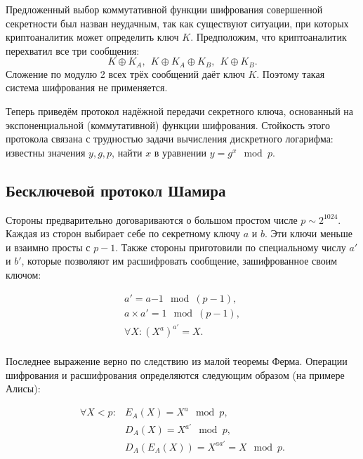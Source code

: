 Предложенный выбор коммутативной функции шифрования совершенной секретности был назван неудачным, так как существуют ситуации, при которых криптоаналитик может определить ключ $K$. Предположим, что криптоаналитик перехватил все три сообщения:
    \[ K \oplus K_A, ~~ K \oplus K_A \oplus K_B, ~~ K \oplus K_B. \]
Сложение по модулю 2 всех трёх сообщений даёт ключ $K$. Поэтому такая система шифрования не применяется.

Теперь приведём протокол надёжной передачи секретного ключа, основанный на экспоненциальной (коммутативной) функции шифрования. Стойкость этого протокола связана с трудностью задачи вычисления дискретного логарифма: известны значения $y, g, p$, найти $x$ в уравнении $y = g^x \mod p$.

\subsection{Бесключевой протокол Шамира}

Стороны предварительно договариваются о большом простом числе $p \sim 2^{1024}$. Каждая из сторон выбирает себе по секретному ключу $a$ и $b$. Эти ключи меньше и взаимно просты с $p-1$. Также стороны приготовили по специальному числу $a'$ и $b'$, которые позволяют им расшифровать сообщение, зашифрованное своим ключом:

\[\begin{array}{l}
a' = a{-1} \mod (p-1), \\
a \times a' = 1 \mod (p-1), \\
\forall X: (X^a)^{a'} = X. \\
\end{array}\]

Последнее выражение верно по следствию из малой теоремы Ферма. Операции шифрования и расшифрования определяются следующим образом (на примере Алисы):

\[\begin{array}{ll}
\forall X < p:	& E_A( X ) = X^{a} \mod p, \\
		& D_A( X ) = X^{a'} \mod p, \\
		& D_A( E_A( X ) ) = X^{aa'} = X \mod p. \\
\end{array}\]

